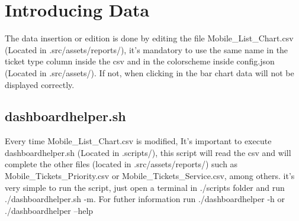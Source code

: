 \documentclass[12pt]{article}
\begin{document}
\section{Introducing Data} %
The data insertion or edition is done by editing the file Mobile\_List\_Chart.csv (Located in .src/assets/reports/), it's mandatory to use the same name in the ticket type column 
inside the csv and in the colorscheme inside config.json (Located in .src/assets/). If not, when clicking in the bar chart data will not be displayed correctly.\par
\subsection{dashboardhelper.sh}
Every time Mobile\_List\_Chart.csv is modified, It's important to execute dashboardhelper.sh (Located in .scripts/), this script will read the csv and will complete the other files (located in .src/assets/reports/)
such as Mobile\_Tickets\_Priority.csv or Mobile\_Tickets\_Service.csv, among others. it's very simple to run the script, just open a terminal in ./scripts folder and run ./dashboardhelper.sh -m.
For futher information run ./dashboardhelper -h or ./dashboardhelper --help
\end{document}
